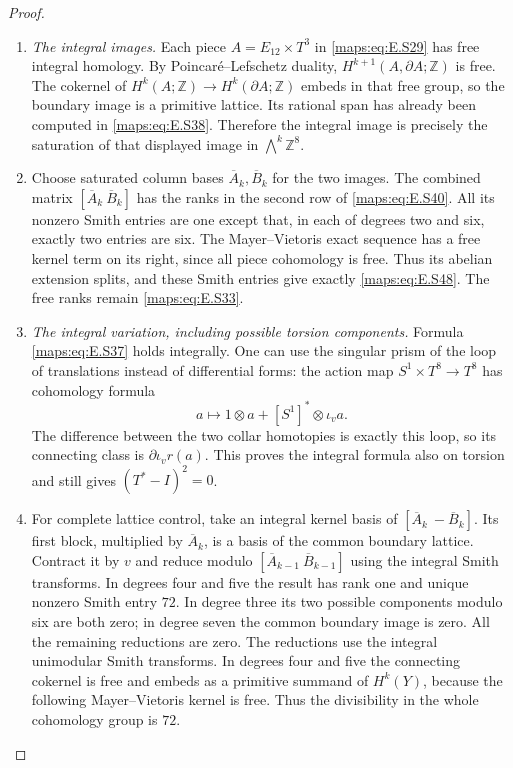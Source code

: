 \begin{proof}
\begin{enumerate}[label={$\langle1\rangle$\arabic*.},leftmargin=*]
\item \emph{The integral images.}
Each piece $A=E_{12}\times T^3$ in \eqref{maps:eq:E.S29} has free
integral homology. By Poincar\'e--Lefschetz duality,
$H^{k+1}(A,\partial A;\mathbb Z)$ is free. The cokernel
of $H^k(A;\mathbb Z)\to H^k(\partial A;\mathbb Z)$
embeds in that free group, so the boundary image is a
primitive lattice. Its rational span has already been
computed in \eqref{maps:eq:E.S38}. Therefore the integral
image is precisely the saturation of that displayed
image in $\bigwedge^k\mathbb Z^8$.

\item Choose saturated column bases $\overline A_k,\overline B_k$
for the two images. The combined matrix
$[\overline A_k\ \overline B_k]$ has the ranks in the
second row of \eqref{maps:eq:E.S40}. All its nonzero Smith entries are
one except that, in each of degrees two and six, exactly
two entries are six. The Mayer--Vietoris exact sequence
has a free kernel term on its right, since all piece
cohomology is free. Thus its abelian extension splits,
and these Smith entries give exactly \eqref{maps:eq:E.S48}. The free
ranks remain \eqref{maps:eq:E.S33}.

\item \emph{The integral variation, including possible torsion components.}
Formula \eqref{maps:eq:E.S37} holds integrally. One can use the singular
prism of the loop of translations instead of differential
forms: the action map $S^1\times T^8\to T^8$ has
cohomology formula
\[
 a\longmapsto 1\otimes a+[S^1]^*\otimes\iota_v a.
\]
The difference between the two collar homotopies is
exactly this loop, so its connecting class is
$\partial\iota_v r(a)$. This proves the integral formula
also on torsion and still gives $(T^*-I)^2=0$.

\item For complete lattice control, take an integral kernel
basis of $[\overline A_k\ -\overline B_k]$. Its first
block, multiplied by $\overline A_k$, is a basis of the
common boundary lattice. Contract it by $v$ and reduce
modulo $[\overline A_{k-1}\ \overline B_{k-1}]$ using
the integral Smith transforms. In degrees four and five
the result has rank one and unique nonzero Smith entry
$72$. In degree three its two possible components
modulo six are both zero; in degree seven the common
boundary image is zero. All the remaining reductions
are zero. The reductions use the integral unimodular Smith transforms.
In degrees four and five the connecting cokernel is
free and embeds as a primitive summand of $H^k(Y)$,
because the following Mayer--Vietoris kernel is free.
Thus the divisibility in the whole cohomology group is $72$.


\end{enumerate}
\end{proof}
